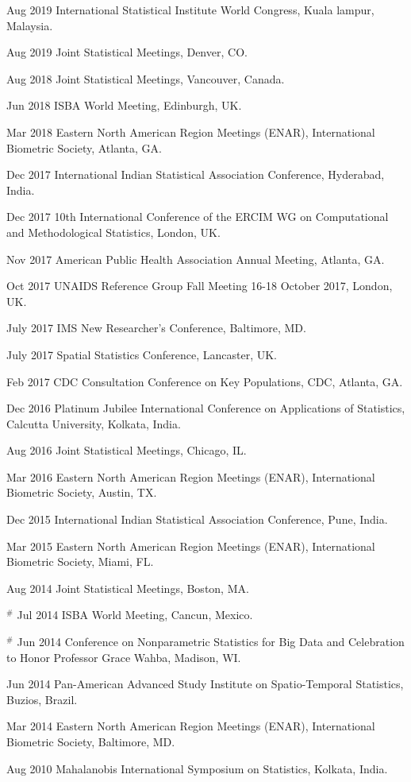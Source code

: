 \documentclass[10pt]{article}
\begin{document}
\item *Aug 2019 International Statistical Institute World Congress, Kuala lampur, Malaysia.
\item *Aug 2019 Joint Statistical Meetings, Denver, CO.
\item *Aug 2018 Joint Statistical Meetings, Vancouver, Canada.
\item *Jun 2018 ISBA World Meeting, Edinburgh, UK.
\item *Mar 2018 Eastern North American Region Meetings (ENAR), International Biometric
Society, Atlanta, GA.
\item *Dec 2017 International Indian Statistical Association Conference, Hyderabad, India.
\item *Dec 2017 10th International Conference of the ERCIM WG on Computational and
Methodological Statistics, London, UK.
\item *Nov 2017 American Public Health Association Annual Meeting, Atlanta, GA.
\item *Oct 2017 UNAIDS Reference Group Fall Meeting 16-18 October 2017, London, UK.
\item July 2017 IMS New Researcher’s Conference, Baltimore, MD.
\item July 2017 Spatial Statistics Conference, Lancaster, UK.
\item *Feb 2017 CDC Consultation Conference on Key Populations, CDC, Atlanta, GA.
\item *Dec 2016 Platinum Jubilee International Conference on Applications of Statistics, Calcutta
University, Kolkata, India.
\item Aug 2016 Joint Statistical Meetings, Chicago, IL.
\item Mar 2016 Eastern North American Region Meetings (ENAR), International Biometric
Society, Austin, TX.
\item Dec 2015 International Indian Statistical Association Conference, Pune, India.
\item Mar 2015 Eastern North American Region Meetings (ENAR), International Biometric
Society, Miami, FL.
\item Aug 2014 Joint Statistical Meetings, Boston, MA.
\item $^\#$ Jul 2014 ISBA World Meeting, Cancun, Mexico.
\item $^\#$ Jun 2014 Conference on Nonparametric Statistics for Big Data and Celebration to Honor
Professor Grace Wahba, Madison, WI.
\item Jun 2014 Pan-American Advanced Study Institute on Spatio-Temporal Statistics, Buzios,
Brazil.
\item Mar 2014 Eastern North American Region Meetings (ENAR), International Biometric
Society, Baltimore, MD.
\item Aug 2010 Mahalanobis International Symposium on Statistics, Kolkata, India.
\end{document}
